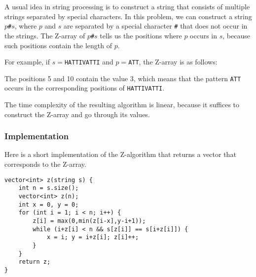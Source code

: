 A usual idea in string processing is to
construct a string that consists of
multiple strings separated by special characters.
In this problem, we can construct a string
$p$\texttt{\#}$s$,
where $p$ and $s$ are separated by a special
character \texttt{\#} that does not occur
in the strings.
The Z-array of $p$\texttt{\#}$s$ tells us the positions
where $p$ occurs in $s$,
because such positions contain the length of $p$.

For example, if $s=$\texttt{HATTIVATTI} and $p=$\texttt{ATT},
the Z-array is as follows:

\begin{center}
\end{center}

The positions 5 and 10 contain the value 3,
which means that the pattern \texttt{ATT}
occurs in the corresponding positions
of \texttt{HATTIVATTI}.

The time complexity of the resulting algorithm
is linear, because it suffices to construct
the Z-array and go through its values.

\subsubsection{Implementation}

Here is a short implementation of the Z-algorithm
that returns a vector that corresponds to the Z-array.

\begin{lstlisting}
vector<int> z(string s) {
    int n = s.size();
    vector<int> z(n);
    int x = 0, y = 0;
    for (int i = 1; i < n; i++) {
        z[i] = max(0,min(z[i-x],y-i+1));
        while (i+z[i] < n && s[z[i]] == s[i+z[i]]) {
            x = i; y = i+z[i]; z[i]++;
        }
    }
    return z;
}
\end{lstlisting}
